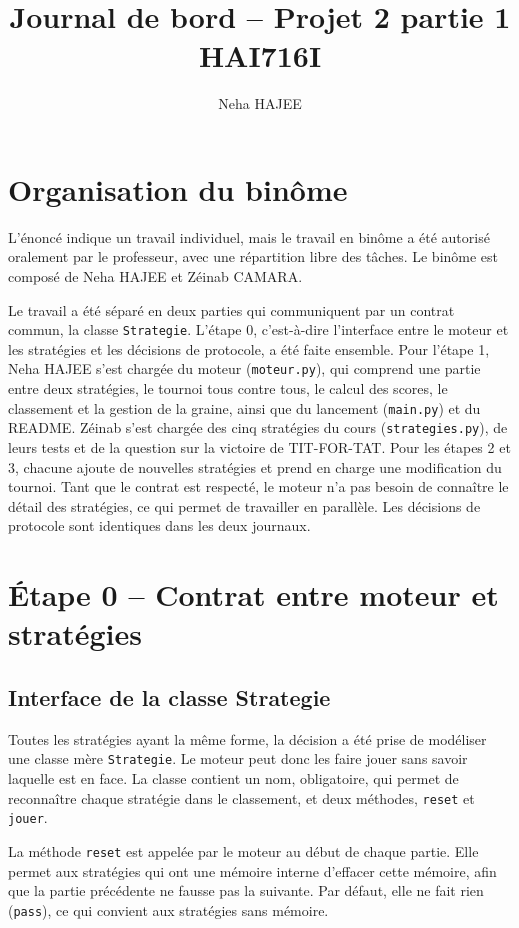 \documentclass[11pt,a4paper]{article}
\title{Journal de bord -- Projet 2 partie 1\\HAI716I}
\author{Neha HAJEE}
\date{}
\begin{document}
\maketitle

\section{Organisation du binôme}
L'énoncé indique un travail individuel, mais le travail en binôme a été autorisé oralement par le professeur, avec une
répartition libre des tâches. Le binôme est composé de Neha HAJEE et Zéinab CAMARA.

Le travail a été séparé en deux parties qui communiquent par un contrat commun, la classe \texttt{Strategie}. L'étape 0,
c'est-à-dire l'interface entre le moteur et les stratégies et les décisions de protocole, a été faite ensemble. Pour l'étape 1,
Neha HAJEE s'est chargée du moteur (\texttt{moteur.py}), qui comprend une partie entre deux stratégies, le tournoi tous contre
tous, le calcul des scores, le classement et la gestion de la graine, ainsi que du lancement (\texttt{main.py}) et du README.
Zéinab s'est chargée des cinq stratégies du cours (\texttt{strategies.py}), de leurs tests et de la question sur la victoire de
TIT-FOR-TAT. Pour les étapes 2 et 3, chacune ajoute de nouvelles stratégies et prend en charge une modification du tournoi.
Tant que le contrat est respecté, le moteur n'a pas besoin de connaître le détail des stratégies, ce qui permet de travailler
en parallèle. Les décisions de protocole sont identiques dans les deux journaux.

\section{Étape 0 -- Contrat entre moteur et stratégies}
\subsection{Interface de la classe Strategie}
Toutes les stratégies ayant la même forme, la décision a été prise de modéliser une classe mère \texttt{Strategie}. Le moteur
peut donc les faire jouer sans savoir laquelle est en face. La classe contient un nom, obligatoire, qui permet de reconnaître
chaque stratégie dans le classement, et deux méthodes, \texttt{reset} et \texttt{jouer}.

La méthode \texttt{reset} est appelée par le moteur au début de chaque partie. Elle permet aux stratégies qui ont une mémoire
interne d'effacer cette mémoire, afin que la partie précédente ne fausse pas la suivante. Par défaut, elle ne fait rien
(\texttt{pass}), ce qui convient aux stratégies sans mémoire.
\end{document}
